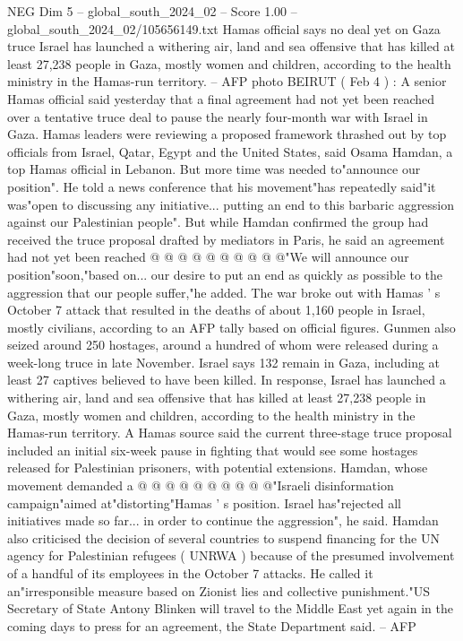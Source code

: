 \begin{textsample}{NEG Dim 5 – global\_south\_2024\_02 – Score 1.00 – global\_south\_2024\_02/105656149.txt}  \label{ex:f5_neg_258}
Hamas official says no deal yet on Gaza truce Israel has launched a withering air, land and sea offensive that has killed at least 27,238 people in Gaza, mostly women and children, according to the health ministry in the Hamas-run territory. -- AFP photo BEIRUT ( Feb 4 ) : A senior Hamas official said yesterday that a final agreement had not yet been reached over a tentative truce deal to pause the nearly four-month war with Israel in Gaza.
Hamas leaders were reviewing a proposed framework thrashed out by top officials from Israel, Qatar, Egypt and the United States, said Osama Hamdan, a top Hamas official in Lebanon.
But more time was needed to"announce our position".
He told a news conference that his movement"has repeatedly said"it was"open to discussing any initiative... putting an end to this barbaric aggression against our Palestinian people".
But while Hamdan confirmed the group had received the truce proposal drafted by mediators in Paris, he said an agreement had not yet been reached @ @ @ @ @ @ @ @ @ @"We will announce our position"soon,"based on... our desire to put an end as quickly as possible to the aggression that our people suffer,"he added.
The war broke out with Hamas ' s October 7 attack that resulted in the deaths of about 1,160 people in Israel, mostly civilians, according to an AFP tally based on official figures.
Gunmen also seized around 250 hostages, around a hundred of whom were released during a week-long truce in late November.
Israel says 132 remain in Gaza, including at least 27 captives believed to have been killed.
In response, Israel has launched a withering air, land and sea offensive that has killed at least 27,238 people in Gaza, mostly women and children, according to the health ministry in the Hamas-run territory.
A Hamas source said the current three-stage truce proposal included an initial six-week pause in fighting that would see some hostages released for Palestinian prisoners, with potential extensions.
Hamdan, whose movement demanded a @ @ @ @ @ @ @ @ @ @"Israeli disinformation campaign"aimed at"distorting"Hamas ' s position.
Israel has"rejected all initiatives made so far... in order to continue the aggression", he said.
Hamdan also criticised the decision of several countries to suspend financing for the UN agency for Palestinian refugees ( UNRWA ) because of the presumed involvement of a handful of its employees in the October 7 attacks.
He called it an"irresponsible measure based on Zionist lies and collective punishment."US Secretary of State Antony Blinken will travel to the Middle East yet again in the coming days to press for an agreement, the State Department said. -- AFP

\end{textsample}
